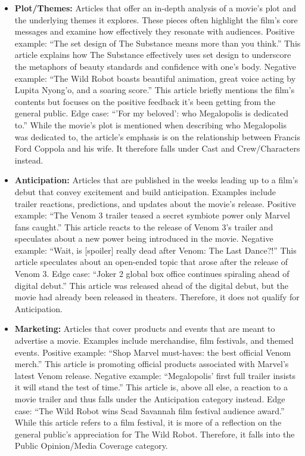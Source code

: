 \documentclass[letterpaper]{article} %
\begin{document}
\begin{itemize}
    \item \textbf{Plot/Themes:}  
    Articles that offer an in-depth analysis of a movie’s plot and the underlying themes it explores. These pieces often highlight the film’s core messages and examine how effectively they resonate with audiences.  
    Positive example: “The set design of The Substance means more than you think.” This article explains how The Substance effectively uses set design to underscore the metaphors of beauty standards and confidence with one’s body.  
    Negative example: “The Wild Robot boasts beautiful animation, great voice acting by Lupita Nyong’o, and a soaring score.” This article briefly mentions the film's contents but focuses on the positive feedback it’s been getting from the general public.  
    Edge case: “'For my beloved': who Megalopolis is dedicated to.” While the movie’s plot is mentioned when describing who Megalopolis was dedicated to, the article’s emphasis is on the relationship between Francis Ford Coppola and his wife. It therefore falls under Cast and Crew/Characters instead.  

    \item \textbf{Anticipation:}  
    Articles that are published in the weeks leading up to a film’s debut that convey excitement and build anticipation. Examples include trailer reactions, predictions, and updates about the movie’s release.  
    Positive example: “The Venom 3 trailer teased a secret symbiote power only Marvel fans caught.” This article reacts to the release of Venom 3’s trailer and speculates about a new power being introduced in the movie.  
    Negative example: “Wait, is [spoiler] really dead after Venom: The Last Dance?!” This article speculates about an open-ended topic that arose after the release of Venom 3.  
    Edge case: “Joker 2 global box office continues spiraling ahead of digital debut.” This article was released ahead of the digital debut, but the movie had already been released in theaters. Therefore, it does not qualify for Anticipation.  

    \item \textbf{Marketing:}  
    Articles that cover products and events that are meant to advertise a movie. Examples include merchandise, film festivals, and themed events.  
    Positive example: “Shop Marvel must-haves: the best official Venom merch.” This article is promoting official products associated with Marvel’s latest Venom release.  
    Negative example: “Megalopolis’ first full trailer insists it will stand the test of time.” This article is, above all else, a reaction to a movie trailer and thus falls under the Anticipation category instead.  
    Edge case: “The Wild Robot wins Scad Savannah film festival audience award.” While this article refers to a film festival, it is more of a reflection on the general public’s appreciation for The Wild Robot. Therefore, it falls into the Public Opinion/Media Coverage category.  


\end{itemize}
\end{document}
